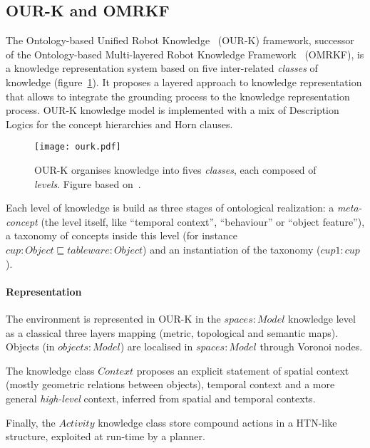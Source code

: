 \documentclass[journal]{IEEEtran}
\begin{document}
\subsection{OUR-K and OMRKF}
\label{sect|omrkf}

The Ontology-based Unified Robot Knowledge~\cite{Lim2011} (OUR-K) framework,
successor of the Ontology-based Multi-layered Robot Knowledge
Framework~\cite{Suh2007} (OMRKF), is a knowledge representation system based on
five inter-related \emph{classes} of knowledge (figure~\ref{fig|omrkf}). It
proposes a layered approach to knowledge representation that allows to
integrate the grounding process to the knowledge representation process. OUR-K
knowledge model is implemented with a mix of Description Logics for the concept
hierarchies and Horn clauses.

\begin{figure}
    \centering
    \texttt{[image: ourk.pdf]}

    \caption{OUR-K organises knowledge into fives \emph{classes}, each composed
    of \emph{levels}. Figure based on~\cite{Lim2011}.}

    \label{fig|omrkf}
\end{figure}

Each level of knowledge is build as three stages of ontological realization: a
\emph{meta-concept} (the level itself, like ``temporal context'', ``behaviour''
or ``object feature''), a taxonomy of concepts inside this level (for instance
$cup : Object \sqsubseteq tableware : Object$) and an instantiation of the
taxonomy ($cup1 : cup$).

\paragraph{Representation} The environment is represented in OUR-K in the
$spaces : Model$ knowledge level as a classical three layers mapping (metric,
topological and semantic maps). Objects (in $objects : Model$) are localised in
$spaces : Model$ through Voronoi nodes.

The knowledge class $Context$ proposes an explicit statement of spatial context
(mostly geometric relations between objects), temporal context and a more
general \emph{high-level} context, inferred from spatial and temporal contexts.

Finally, the $Activity$ knowledge class store compound actions in a HTN-like
structure, exploited at run-time by a planner.

\end{document}
